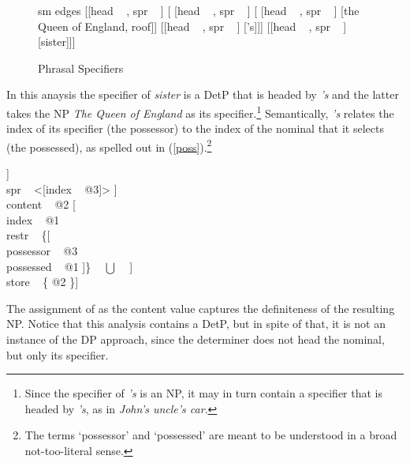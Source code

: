 \documentclass[output=paper]{langsci/langscibook}
\begin{document}
\begin{figure}
	\centering
	\begin{forest}
sm edges
[{[{\sc head} ~  , {\sc spr} ~ \eliste]}
	[{ [{\sc head} ~  , {\sc spr} ~ \eliste]}
		[{ [{\sc head} ~ , {\sc spr} ~ \eliste]} [the Queen of England, roof]]
		[{[{\sc head} ~ , {\sc spr} ~ ]} ['s]]]
	[{[{\sc head} ~ , {\sc spr} ~ ]} [sister]]]
	\end{forest}
	\caption{\label{cousin} Phrasal Specifiers }  
\end{figure}

In this anaysis the specifier of \emph{sister} is a DetP that is headed by \emph{'s} 
and the latter takes the NP \emph{The Queen of England} as its specifier.\footnote{Since the 
specifier of \emph{'s} is an NP, it may in turn contain a specifier that is headed 
by \emph{'s}, as in \emph{John's uncle's car}.}
Semantically, \emph{'s} relates the index of its specifier (the possessor) to the index
of the nominal that it selects (the possessed), as spelled out in (\ref{poss}).\footnote{The
terms `possessor' and `possessed' are meant to be understood in a broad not-too-literal sense.}     

\begin{exe} 
\ex\label{poss}
\begin{avm}
[cat [head [\type{det}                       \\
            spec [\type{parameter}           \\
                  index ~ @1                  \\
                  restr ~ \avmbox{$\Sigma$} ]] \\
      spr ~ <[index ~ @3]> ]                  \\
 content ~ @2 [                \\
               index ~ @1                     \\
               restr ~ \{[    \\
                          possessor ~ @3      \\
                          possessed ~ @1 ]\} ~ $\bigcup$ ~ \avmbox{$\Sigma$} ] \\
 store ~ \{ @2 \}]  
\end{avm}
\end{exe}

\noindent
The assignment of  as the {\sc content} value captures 
the definiteness of the resulting NP. Notice that this analysis contains a DetP, 
but in spite of that, it is not an instance of the DP approach, since the 
determiner does not head the nominal, but only its specifier. 
\end{document}
